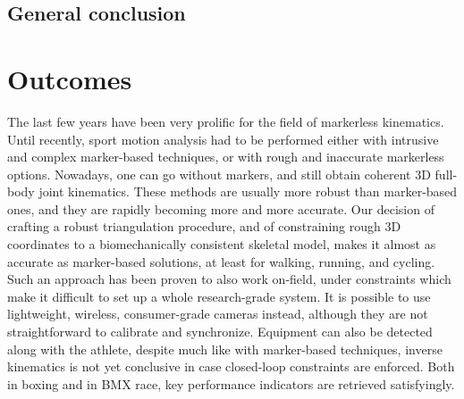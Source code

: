 

{} \mtcaddchapter
{}

\vspace*{-1cm}
\begin{flushright}
\section*{\fontsize{20pt}{20pt}\selectfont\textnormal{General conclusion}}
\end{flushright}
\vspace{2cm}

\chead[\fancyplain{}{}]
      {\fancyplain{}{}}
\lfoot[\fancyplain{}{}]
      {\fancyplain{}{}}
\cfoot[\fancyplain{}{\thepage}]
      {\fancyplain{}{\thepage}}
\rfoot[\fancyplain{}{}]
     {\fancyplain{}{\scriptsize}}


\section*{Outcomes}
The last few years have been very prolific for the field of markerless kinematics. Until recently, sport motion analysis had to be performed either with intrusive and complex marker-based techniques, or with rough and inaccurate markerless options. Nowadays, one can go without markers, and still obtain coherent 3D full-body joint kinematics. These methods are usually more robust than marker-based ones, and they are rapidly becoming more and more accurate. Our decision of crafting a robust triangulation procedure, and of constraining rough 3D coordinates to a biomechanically consistent skeletal model, makes it almost as accurate as marker-based solutions, at least for walking, running, and cycling. Such an approach has been proven to also work on-field, under constraints which make it difficult to set up a whole research-grade system. It is possible to use lightweight, wireless, consumer-grade cameras instead, although they are not straightforward to calibrate and synchronize. Equipment can also be detected along with the athlete, despite much like with marker-based techniques, inverse kinematics is not yet conclusive in case closed-loop constraints are enforced. Both in boxing and in BMX race, key performance indicators are retrieved satisfyingly. 

